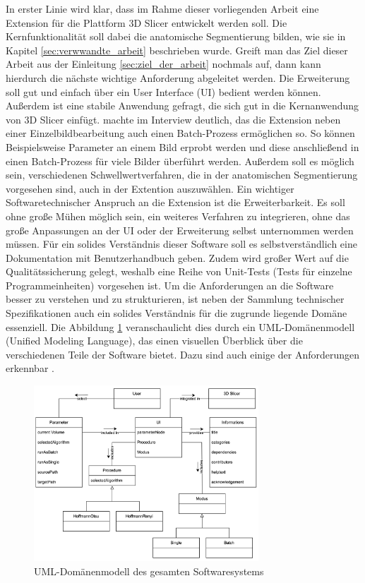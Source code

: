 In erster Linie wird klar, dass im Rahme dieser vorliegenden Arbeit eine
Extension für die Plattform 3D Slicer entwickelt werden soll. Die Kernfunktionalität
soll dabei die anatomische Segmentierung bilden, wie sie in Kapitel
\ref{sec:verwwandte_arbeit} beschrieben wurde. Greift man das Ziel dieser Arbeit
aus der Einleitung \ref{sec:ziel_der_arbeit} nochmals auf, dann kann hierdurch
die nächste wichtige Anforderung abgeleitet werden. Die Erweiterung soll gut und
einfach über ein User Interface (UI) bedient werden können. Außerdem ist eine
stabile Anwendung gefragt, die sich gut in die Kernanwendung von 3D Slicer einfügt.
\citet[]{walter2025} machte im Interview deutlich, das die Extension neben einer
Einzelbildbearbeitung auch einen Batch-Prozess ermöglichen so. So können Beispielsweise
Parameter an einem Bild erprobt werden und diese anschließend in einen Batch-Prozess
für viele Bilder überführt werden. Außerdem soll es möglich sein, verschiedenen Schwellwertverfahren,
die in der anatomischen Segmentierung vorgesehen sind, auch in der Extention auszuwählen.
Ein wichtiger Softwaretechnischer Anspruch an die Extension ist die
Erweiterbarkeit. Es soll ohne große Mühen möglich sein, ein weiteres Verfahren
zu integrieren, ohne das große Anpassungen an der UI oder der Erweiterung selbst
unternommen werden müssen. Für ein solides Verständnis dieser Software soll es selbstverständlich
eine Dokumentation mit Benutzerhandbuch geben. Zudem wird großer Wert auf die
Qualitätssicherung gelegt, weshalb eine Reihe von Unit-Tests (Tests für einzelne
Programmeinheiten) vorgesehen ist. Um die Anforderungen an die Software besser
zu verstehen und zu strukturieren, ist neben der Sammlung technischer Spezifikationen
auch ein solides Verständnis für die zugrunde liegende Domäne essenziell. Die
Abbildung \ref{fig:3d_slicer_domäne} veranschaulicht dies durch ein UML-Domänenmodell
(Unified Modeling Language), das einen visuellen Überblick über die verschiedenen
Teile der Software bietet. Dazu sind auch einige der Anforderungen erkennbar
\citep[vgl.][]{walter2025}.

\begin{figure}[h]
	\centering
	\includegraphics[width=0.75\textwidth]{img/domaenenmodell.jpg}
	\caption{UML-Domänenmodell des gesamten Softwaresystems}
	\label{fig:3d_slicer_domäne}
\end{figure}

